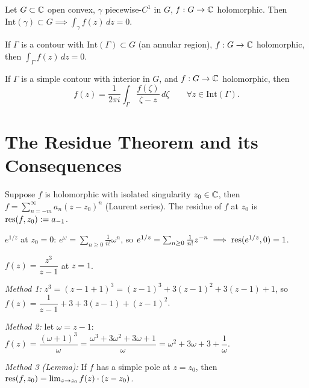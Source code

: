 \documentclass[11pt]{article}
\begin{document}
\begin{corollary}
Let $G\subset{\mathbb{C}}$ open convex, $\gamma$ piecewise-$C^1$ in $G$, $f:G\to{\mathbb{C}}$ holomorphic. Then $\mathrm{Int}(\gamma)\subset G \implies \int_\gamma f(z)\,dz=0$.
\end{corollary}

\begin{corollary}
If $\Gamma$ is a contour with $\mathrm{Int}(\Gamma)\subset G$ (an annular region), $f:G\to{\mathbb{C}}$ holomorphic, then $\int_\Gamma f(z)\,dz=0$.
\end{corollary}

\begin{corollary}
If $\Gamma$ is a simple contour with interior in $G$, and $f:G\to{\mathbb{C}}$ holomorphic, then
\[
f(z) = \frac{1}{2\pi i}\int_\Gamma \frac{f(\zeta)}{\zeta-z}\,d\zeta \qquad \forall z\in\mathrm{Int}(\Gamma).
\]
\end{corollary}

\newpage
\section{The Residue Theorem and its Consequences}

\begin{definition}[Residue]
Suppose $f$ is holomorphic with isolated singularity $z_0\in{\mathbb{C}}$, then $f=\sum_{n=-m}^\infty a_n(z-z_0)^n$ (Laurent series). The residue of $f$ at $z_0$ is $\operatorname{res}(f,z_0) := a_{-1}$.
\end{definition}

\begin{example}
$e^{1/z}$ at $z_0=0$: $e^\omega = \sum_{n\ge0}\frac{1}{n!}\omega^n$, so $e^{1/z} = \sum_{n\ge0}\frac{1}{n!}z^{-n} \implies \operatorname{res}(e^{1/z},0)=1$.
\end{example}

\begin{example}
$f(z)=\dfrac{z^3}{z-1}$ at $z=1$.

\emph{Method 1:} $z^3 = (z-1+1)^3 = (z-1)^3+3(z-1)^2+3(z-1)+1$, so $f(z) = \dfrac{1}{z-1} + 3 + 3(z-1) + (z-1)^2$.

\emph{Method 2:} let $\omega=z-1$: $f(z) = \dfrac{(\omega+1)^3}{\omega} = \dfrac{\omega^3+3\omega^2+3\omega+1}{\omega} = \omega^2+3\omega+3+\dfrac1\omega$.

\emph{Method 3 (Lemma):} If $f$ has a simple pole at $z=z_0$, then $\operatorname{res}(f,z_0) = \lim_{z\to z_0} f(z)\cdot(z-z_0)$.
\end{example}
\end{document}
